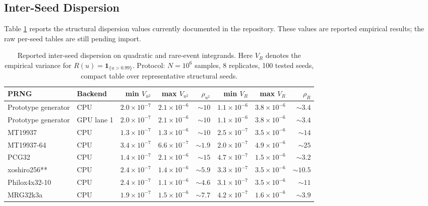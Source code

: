 \documentclass[11pt,a4paper]{article}
\begin{document}
\subsection{Inter-Seed Dispersion}

Table \ref{tab:dispersion} reports the structural dispersion values currently documented in the repository. These values are reported empirical results; the raw per-seed tables are still pending import.

\begin{table}[ht]
\centering
\scriptsize
\begin{tabular}{llrrrrrr}
\toprule
PRNG & Backend & min $V_{u^2}$ & max $V_{u^2}$ & $\rho_{u^2}$ & min $V_R$ & max $V_R$ & $\rho_R$ \\
\midrule
Prototype generator & CPU & $2.0{\times}10^{-7}$ & $2.1{\times}10^{-6}$ & $\sim 10$ & $1.1{\times}10^{-6}$ & $3.8{\times}10^{-6}$ & $\sim 3.4$ \\
Prototype generator & GPU lane 1 & $2.0{\times}10^{-7}$ & $2.1{\times}10^{-6}$ & $\sim 10$ & $1.1{\times}10^{-6}$ & $3.8{\times}10^{-6}$ & $\sim 3.4$ \\
MT19937 & CPU & $1.3{\times}10^{-7}$ & $1.3{\times}10^{-6}$ & $\sim 10$ & $2.5{\times}10^{-7}$ & $3.5{\times}10^{-6}$ & $\sim 14$ \\
MT19937-64 & CPU & $3.4{\times}10^{-7}$ & $6.6{\times}10^{-7}$ & $\sim 1.9$ & $2.0{\times}10^{-7}$ & $4.9{\times}10^{-6}$ & $\sim 25$ \\
PCG32 & CPU & $1.4{\times}10^{-7}$ & $2.1{\times}10^{-6}$ & $\sim 15$ & $4.7{\times}10^{-7}$ & $1.5{\times}10^{-6}$ & $\sim 3.2$ \\
xoshiro256** & CPU & $2.4{\times}10^{-7}$ & $1.4{\times}10^{-6}$ & $\sim 5.9$ & $3.3{\times}10^{-7}$ & $3.5{\times}10^{-6}$ & $\sim 10.5$ \\
Philox4x32-10 & CPU & $2.4{\times}10^{-7}$ & $1.1{\times}10^{-6}$ & $\sim 4.6$ & $3.1{\times}10^{-7}$ & $3.5{\times}10^{-6}$ & $\sim 11$ \\
MRG32k3a & CPU & $1.9{\times}10^{-7}$ & $1.5{\times}10^{-6}$ & $\sim 7.7$ & $4.2{\times}10^{-7}$ & $1.6{\times}10^{-6}$ & $\sim 3.9$ \\
\bottomrule
\end{tabular}
\caption{Reported inter-seed dispersion on quadratic and rare-event integrands. Here $V_R$ denotes the empirical variance for $R(u)=\mathbf{1}_{\{u>0.99\}}$. Protocol: $N=10^6$ samples, 8 replicates, 100 tested seeds, compact table over representative structural seeds.}
\label{tab:dispersion}
\end{table}
\end{document}

